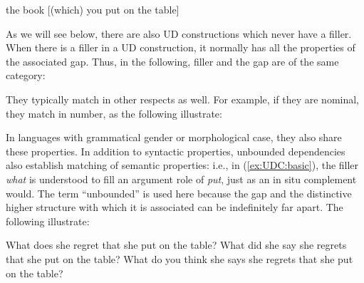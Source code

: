 \documentclass[output=paper
                ,modfonts
                ,nonflat
	        ,collection
	        ,collectionchapter
	        ,collectiontoclongg
 	        ,biblatex
                ,babelshorthands
                ,newtxmath
                ,draftmode
                ,colorlinks, citecolor=brown
]{./langsci/langscibook}
\begin{document}
{  \begin{exe} \ex \label{ex:UDC:2} the book {[}(which) you put
    \trace{} on the table{]} \end{exe} \noindent As we will see below,
  there are also UD constructions which never have a filler.  When
  there is a filler in a UD construction, it normally has all the
  properties of the associated gap. Thus, in the following, filler and
  the gap are of the same category:

  \begin{exe}
    \ex \begin{xlist} \label{ex:UDC:3}   
          \end{xlist} \end{exe} \noindent They typically match
  in other respects as well. For example, if they are nominal, they
  match in number, as the following illustrate:

  \begin{exe}
    \ex \begin{xlist} \label{ex:UDC:4} 
        \end{xlist} \end{exe}

  \noindent In languages with
  grammatical gender or morphological case, they also share these
  properties.  In addition to syntactic properties, unbounded
  dependencies also establish matching of semantic properties: i.e.,
  in (\ref{ex:UDC:basic}), the filler \textit{what} is understood to
  fill an argument role of \textit{put}, just as an in situ complement
  would.  The term ``unbounded'' is used here because the gap and the
  distinctive higher structure with which it is associated can be
  indefinitely far apart. The following illustrate:

  \begin{exe}
    \ex \begin{xlist} \label{ex:UDC:5} \ex What does she regret that
      she put \trace{} on the table?  \ex What did she say she regrets
      that she put \trace{} on the table?  \ex What do you think she
      says she regrets that she put \trace{} on the
      table?  \end{xlist} \end{exe}

}
\end{document}
